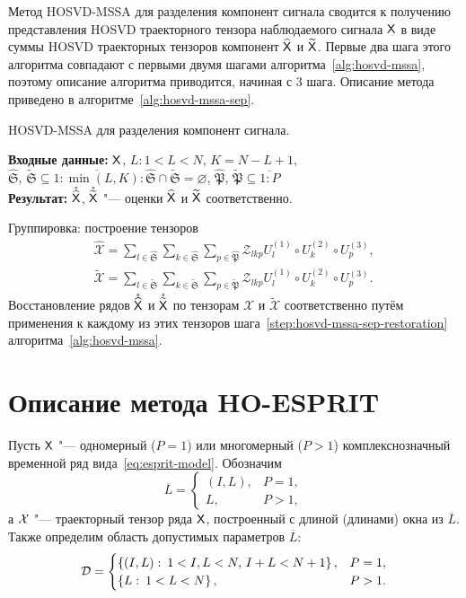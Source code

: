 \documentclass[specialist,
  substylefile=spbu_report.rtx,
subf,href,colorlinks=true, 12pt]{disser}
\theoremstyle{plain}
\theoremstyle{definition}
\theoremstyle{remark}
\newcommand{\Input}{\textbf{Входные данные: }}
\newcommand{\Output}{\textbf{Результат: }}
\begin{document}
Метод HOSVD-MSSA для разделения компонент сигнала сводится к получению представления HOSVD траекторного тензора
наблюдаемого сигнала $\mathsf{X}$ в виде суммы HOSVD траекторных тензоров компонент $\widehat{\mathsf{X}}$ и $\widetilde{\mathsf{X}}$.
Первые два шага этого алгоритма совпадают с первыми двумя шагами алгоритма~\ref{alg:hosvd-mssa}, поэтому
описание алгоритма приводится, начиная с 3 шага.
Описание метода приведено в алгоритме~\ref{alg:hosvd-mssa-sep}.
\begin{algorithm}[!ht]
  \caption{HOSVD-MSSA для разделения компонент сигнала.}
  \label{alg:hosvd-mssa-sep}
  \Input $\mathsf{X}$,
  $L: 1< L < N$, $K = N - L + 1$,
  $\widehat{\mathfrak{S}},\, \widetilde{\mathfrak{S}} \subseteq \overline{1:\min(L, K)}:
  \widehat{\mathfrak{S}} \cap \widetilde{\mathfrak{S}} = \varnothing$,
  $\widehat{\mathfrak{P}},\, \widetilde{\mathfrak{P}}  \subseteq \overline{1:P}$\\
  \Output $\mathring{\widehat{\mathsf{X}}}$, $\mathring{\widetilde{\mathsf{X}}}$ "--- оценки $\widehat{\mathsf{X}}$ и $\widetilde{\mathsf{X}}$
  соответственно.
  \begin{algorithmic}[1]
    \setcounter{ALG@line}{2}
    \State Группировка: построение тензоров
    \begin{gather*}
      \widehat{\mathcal{X}}=\sum_{l \in \widehat{\mathfrak{S}}} \sum_{k\in \widehat{\mathfrak{S}}}
      \sum_{p\in \widehat{\mathfrak{P}}}
      \mathcal{Z}_{lkp} U^{(1)}_{l}\circ U^{(2)}_{k} \circ U^{(3)}_{p},\\
      \widetilde{\mathcal{X}}=\sum_{l \in \widetilde{\mathfrak{S}}} \sum_{k\in \widetilde{\mathfrak{S}}}
      \sum_{p\in \widetilde{\mathfrak{P}}}
      \mathcal{Z}_{lkp} U^{(1)}_{l}\circ U^{(2)}_{k} \circ U^{(3)}_{p}.
    \end{gather*}
    \State Восстановление рядов $\mathring{\widehat{\mathsf{X}}}$ и $\mathring{\widetilde{\mathsf{X}}}$ по тензорам $\widehat{\mathcal{X}}$ и $\widetilde{\mathcal{X}}$ соответственно путём применения к
    каждому из этих тензоров шага~\ref{step:hosvd-mssa-sep-restoration} алгоритма~\ref{alg:hosvd-mssa}.
  \end{algorithmic}
\end{algorithm}

\section{Описание метода HO-ESPRIT}\label{seq:Tensor-esprit-description}
Пусть $\mathsf{X}$ "--- одномерный ($P=1$) или многомерный ($P>1$) комплекснозначный временной ряд
вида~\eqref{eq:esprit-model}.
Обозначим
\[
  \overline{L} =
  \begin{cases}
    (I, L), & P=1,\\
    L, & P>1,
  \end{cases}
\]
а $\mathcal{X}$ "--- траекторный тензор ряда $\mathsf{X}$, построенный с длиной (длинами) окна из $\overline{L}$.
Также определим область допустимых параметров $\overline{L}$:
\[
  \mathcal{D} =
  \begin{cases}
    \left\{ (I, L):\: 1< I,L <N,\, I + L < N + 1 \right\}, & P = 1,\\
    \left\{ L:\: 1< L <N \right\}, & P > 1.
  \end{cases}
\]
\end{document}
